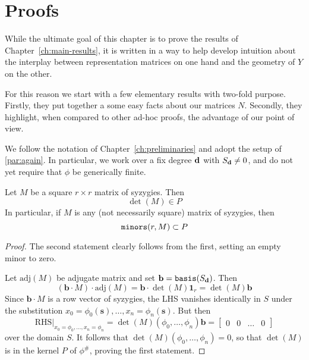 \documentclass[fleqn,reqno]{amsart}
\begin{document}
\section{Proofs}
\label{sec:proofs}

\begin{paragraf*}
While the ultimate goal of this chapter is to prove the results of Chapter~\ref{ch:main-results},
it is written in a way to help develop intuition about the interplay between
representation matrices on one hand and the geometry of $Y$ on the other.

For this reason we start with a few elementary results with two-fold purpose.
Firstly, they put together a some easy facts about our matrices $N$.
Secondly, they highlight, when compared to other ad-hoc proofs, the advantage of our point of view.
\end{paragraf*}

\begin{paragraf*}
We follow the notation of Chapter~\ref{ch:preliminaries} and
adopt the setup of \eqref{par:again}.
In particular, we work over a fix degree $\mathbf d$ with $S_\mathbf d\neq0$,
and do not yet require that $\phi$ be generically finite.
\end{paragraf*}

\begin{lemma}
\label{lemma:detM-P}
Let $M$ be a square $r\times r$ matrix of syzygies.
Then
\[
	\det(M)\in P
\]
In particular, if $M$ is any (not necessarily square) matrix of syzygies, then
\[
	\mathop{\tt minors}(r,M)\subset P
\]
\end{lemma}

\begin{proof}
The second statement clearly follows from the first, setting an empty minor to zero.

Let $\text{adj}(M)$ be adjugate matrix and set $\mathbf b=\mathop{\tt basis}(S_\mathbf d)$.
Then
\[
	(\mathbf b\cdot M)\cdot\text{adj}(M)=\mathbf b\cdot\det(M)\mathbf 1_r=\det(M)\mathbf b
\]
Since $\mathbf b\cdot M$ is a row vector of syzygies,
the LHS vanishes identically in $S$ under the substitution
$x_0=\phi_0(\mathbf s),\ldots,x_n=\phi_n(\mathbf s)$.
But then
\[
	\text{RHS}|_{x_0=\phi_0,\ldots,x_n=\phi_n}=\det(M)(\phi_0,\ldots,\phi_n)\mathbf b=
	\begin{bmatrix}0& 0& \ldots& 0\end{bmatrix}
\]
over the domain $S$.
It follows that $\det(M)(\phi_0,\ldots,\phi_n)=0$,
so that $\det(M)$ is in the kernel $P$ of $\phi^\#$, proving the first statement.
\end{proof}
\end{document}

